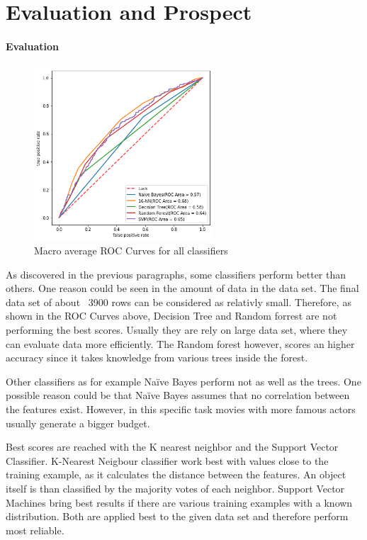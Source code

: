 \section{Evaluation and Prospect}
\paragraph{Evaluation}

\label{cha:prospect}

\begin{figure}
	\includegraphics[width=0.6\textwidth]{images/roc.png}
	\caption{Macro average ROC Curves for all classifiers}
	\label{img:roc}
\end{figure}

As discovered in the previous paragraphs, some classifiers perform better than others. One reason could be seen in the amount of data in the data set. The final data set of about ~3900 rows can be considered as relativly small. Therefore, as shown in the ROC Curves above, Decision Tree and Random forrest are not performing the best scores. Usually they are rely on large data set, where they can evaluate data more efficiently. The Random forest however, scores an higher accuracy since it takes knowledge from various trees inside the forest.



Other classifiers as for example Na\"{i}ve Bayes perform not as well as the trees. One possible reason could be that Na\"{i}ve Bayes assumes that no correlation between the features exist. However, in this specific task movies with more famous actors usually generate a bigger budget. 

Best scores are reached with the K nearest neighbor and the Support Vector Classifier. K-Nearest Neigbour classifier work best with values close to the training example, as it calculates the distance between the features. An object itself is than classified by the majority votes of each neighbor.
Support Vector Machines bring best results if there are various training examples with a known distribution. Both are applied best to the given data set and therefore perform most reliable.








